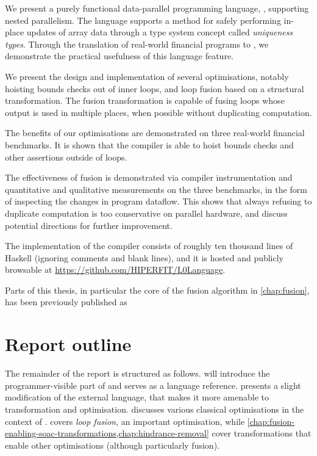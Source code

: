 We present a purely functional data-parallel programming language,
\LO{}, supporting nested parallelism.  The language supports a method
 for safely performing in-place updates of array data through
a type system concept called \textit{uniqueness types}.  Through the
translation of real-world financial programs to \LO{}, we demonstrate
the practical usefulness of this language feature.

We present the design and implementation of several optimisations,
notably hoisting bounds checks out of inner loops, and loop fusion
based on a structural transformation.  The fusion transformation is
capable of fusing loops whose output is used in multiple places, when
possible without duplicating computation.

The benefits of our optimisations are demonstrated on three real-world
financial benchmarks.  It is shown that the compiler is able to hoist
bounds checks and other assertions outside of loops.

The effectiveness of fusion is demonstrated via compiler
instrumentation and quantitative and qualitative measurements on the
three benchmarks, in the form of inspecting the changes in program
dataflow.  This shows that always refusing to duplicate computation is
too conservative on parallel hardware, and discuss potential
directions for further improvement.

The implementation of the \LO{} compiler consists of roughly ten
thousand lines of Haskell (ignoring comments and blank lines), and it
is hosted and publicly browsable at
\url{https://github.com/HIPERFIT/L0Language}.

Parts of this thesis, in particular the core of the fusion algorithm
in \cref{chap:fusion}, has been previously published as

\begin{quote}
\end{quote}

\section{Report outline}

The remainder of the report is structured as follows.
 will introduce the
programmer-visible part of \LO{} and serves as a language reference.
 presents a slight modification of the external
language, that makes it more amenable to transformation and
optimisation.   discusses various
classical optimisations in the context of \LO{}.  
covers \textit{loop fusion}, an important optimisation, while
\cref{chap:fusion-enabling-soac-transformations,chap:hindrance-removal}
cover transformations that enable other optimisations (although
particularly fusion).

